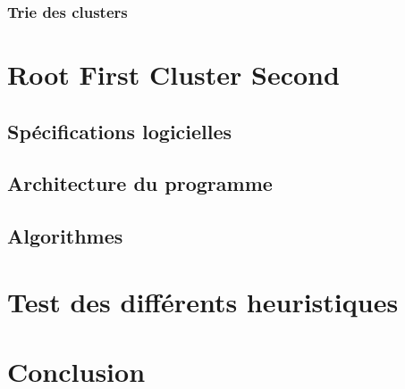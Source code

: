\documentclass[twoside,UTF8]{EPURapport}
\begin{document}
\subsection{Trie des clusters}




\chapter{Root First Cluster Second}

\section{Spécifications logicielles}

\section{Architecture du programme}

\section{Algorithmes}



\chapter{Test des différents heuristiques}
\label{chap:test}

\chapter{Conclusion}

\end{document}
